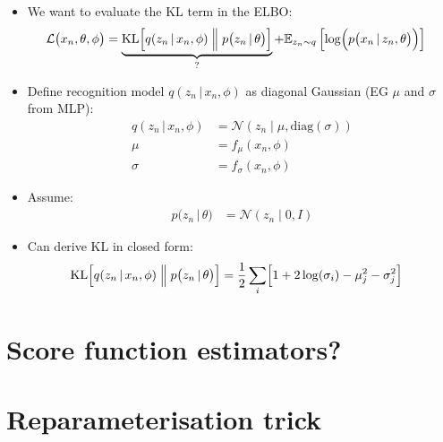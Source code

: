 \documentclass{article}
\begin{document}
\begin{itemize}
    \item We want to evaluate the KL term in the ELBO:
    \begin{align}
        \mathcal{L}\bigl( x_n, \theta, \phi \bigr) &= \underbrace{\text{KL}\Bigl[ q(z_n \,\vert\, x_n, \phi) \Bigm\Vert p\bigl(z_n \,\vert\, \theta\bigr) \Bigr]}_? + \mathbb{E}_{z_n\sim q} \left[ \log \Bigl( p\bigl(x_n \,\vert\, z_n, \theta\bigr) \Bigr) \right]
    \end{align}
    \item Define recognition model $q(z_n \,\vert\, x_n, \phi)$ as diagonal Gaussian (EG $\mu$ and $\sigma$ from MLP):
    \begin{align}
        q(z_n \,\vert\, x_n, \phi) &= \mathcal{N}( z_n \;\vert\; \mu, \text{diag}(\sigma) ) \\
        \mu &= f_\mu(x_n, \phi) \\
        \sigma &= f_\sigma(x_n, \phi)
    \end{align}
    \item Assume:
    \begin{align}
        p\bigl(z_n \,\vert\, \theta\bigr) &= \mathcal{N}(z_n \;\vert\; 0, I )
    \end{align}
    \item[$\Rightarrow$] Can derive KL in closed form:
    \begin{align}
        \text{KL}\Bigl[ q(z_n \,\vert\, x_n, \phi) \Bigm\Vert p\bigl(z_n \,\vert\, \theta\bigr) \Bigr] &= \frac{1}{2}\sum_i \Bigl[ 1 + 2\log(\sigma_i) - \mu_j^2 - \sigma_j^2 \Bigr]
    \end{align}
\end{itemize}

\newpage
\section{Score function estimators?}

\newpage
\section{Reparameterisation trick}

\newpage


\end{document}
